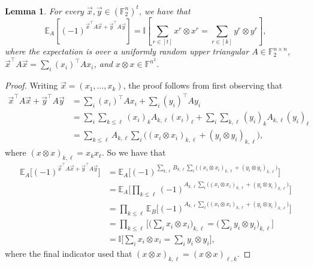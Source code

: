 \documentclass[11pt]{article}
\newtheorem{lemma}[theorem]{Lemma}
\newcommand{\id}{\ensuremath{\mathbb{I}}}
\newcommand{\F}{\mathbb{F}}
\begin{document}
\begin{lemma}
\label{fact:expectatationoverrandomdegree-2}
For every $\vec{x},\vec{y}\in (\F_2^n)^t$, we have that 
$$
\mathbb{E}_A[(-1)^{\vec{x}^\top A \vec{x}+\vec{y}^\top A \vec{y}}]=\id\left[\sum_{r\in [t]}x^r\otimes x^r=\sum_{r\in [k]}y^r\otimes y^r\right],
$$
where the expectation is over a uniformly random upper triangular $A\in \F_2^{n\times n}$, $\vec{x}^\top A\vec{x} = \sum_i (x_i)^\top A x_i$, and $x\otimes x\in \F^{n^2}$.
\end{lemma}
\begin{proof}
   Writing $\vec{x}=(x_1,\ldots,x_k)$, the proof follows from first observing that
    \begin{align*}
        \vec{x}^\top A \vec{x}+\vec{y}^\top A \vec{y}&=\sum_i (x_i)^\top A x_i+\sum_i (y_i)^\top A y_i\\
        &=\sum_i \sum_{k\leq \ell}(x_i)_{k} A_{k,\ell} (x_i)_{\ell}+\sum_i \sum_{k,\ell}(y_i)_{k} A_{k,\ell} (y_i)_{\ell}\\
        &=\sum_{k\leq \ell}A_{k,\ell} \sum_i\Big((x_i\otimes x_i)_{k,\ell}+(y_i\otimes y_i)_{k,\ell}\Big),
    \end{align*}
    where $(x\otimes x)_{k,\ell}=x_kx_\ell$. So we have that
    \begin{align*}
        \mathbb{E}_A\Big[(-1)^{\vec{x}^\top A \vec{x}+\vec{y}^\top A \vec{y}}\Big]&=\mathbb{E}_A\Big[(-1)^{\sum_{k,\ell}B_{k,\ell} \sum_i\Big((x_i\otimes x_i)_{k,\ell}+(y_i\otimes y_i)_{k,\ell}\Big)}\Big]\\
        &=\mathbb{E}_A\Big[\prod_{k\leq \ell}(-1)^{A_{k,\ell} \sum_i\Big((x_i\otimes x_i)_{k,\ell}+(y_i\otimes y_i)_{k,\ell}\Big)}\Big]\\
        &=\prod_{k\leq \ell}\mathbb{E}_B\Big[(-1)^{A_{k,\ell} \sum_i\Big((x_i\otimes x_i)_{k,\ell}+(y_i\otimes y_i)_{k,\ell}\Big)}\Big]\\
        &=\prod_{k\leq \ell}\Big[\Big(\sum_i x_i\otimes x_i\Big)_{k,\ell}=\Big(\sum_i y_i\otimes y_i\Big)_{k,\ell}\Big]\\
        &=\id\Big[\sum_i x_i\otimes x_i=\sum_i y_i\otimes y_i\Big],
    \end{align*}
    where the final indicator used that $(x\otimes x)_{k,\ell}=(x\otimes x)_{\ell,k}$.
\end{proof}
\end{document}
